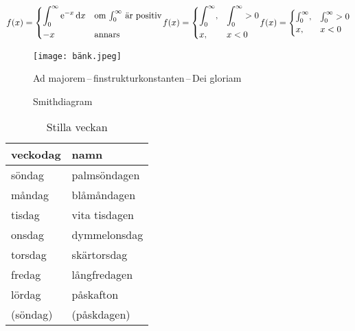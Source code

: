 \documentclass[a4paper, article, oneside]{memoir}
\begin{document}
\begin{subequations}
\begin{align}
  f(x) =
  \begin{dcases*}
      \int_0^\infty \mathrm{e}^{-x}\,\mathrm{d}x & om $\int_0^\infty$ är positiv\\
    -x & annars
  \end{dcases*}
\end{align}

\begin{align}
  f(x) =
  \begin{dcases}
    \int_0^\infty, & \int_0^\infty > 0 \\
    x, & x < 0
  \end{dcases}
\end{align}

\begin{align}
  f(x) =
  \begin{cases}
    \int_0^\infty, & \int_0^\infty > 0 \\
    x, & x < 0
  \end{cases}
\end{align}
\end{subequations}

\begin{figure}[ht]
\centering
\texttt{[image: bänk.jpeg]}
\caption{Ad majorem\,--\,finstrukturkonstanten\,--\,Dei gloriam}
\label{fig:bänk}
\end{figure}

\begin{figure}[ht]
\centering

\caption{Smithdiagram}
\label{fig:smith}
\end{figure}

\begin{table}[ht]  
\centering
\begin{tabular}{ll}
\toprule
veckodag & namn \\
\midrule
söndag & palmsöndagen \\
måndag & blåmåndagen \\
tisdag & vita tisdagen \\
onsdag & dymmelonsdag \\
torsdag & skärtorsdag \\
fredag & långfredagen \\
lördag & påskafton \\
(söndag) & (påskdagen) \\
\bottomrule
\end{tabular}
\caption{Stilla veckan}
\label{tab:stilla}
\end{table}
\end{document}
